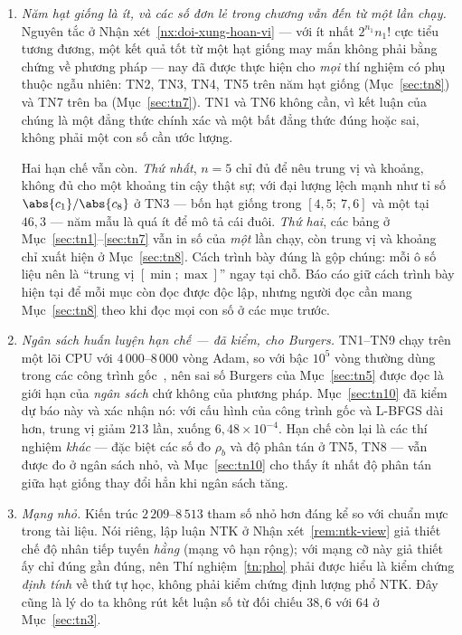 \begin{enumerate}[label=(\arabic*),leftmargin=2.2em,itemsep=4pt]
\item \emph{Năm hạt giống là ít, và các số đơn lẻ trong chương vẫn đến từ một
lần chạy.} Nguyên tắc ở Nhận xét~\ref{nx:doi-xung-hoan-vi} --- với ít nhất
$2^{n_1}n_1!$ cực tiểu tương đương, một kết quả tốt từ một hạt giống may mắn
không phải bằng chứng về phương pháp --- nay đã được thực hiện cho \emph{mọi}
thí nghiệm có phụ thuộc ngẫu nhiên: TN2, TN3, TN4, TN5 trên năm hạt giống
(Mục~\ref{sec:tn8}) và TN7 trên ba (Mục~\ref{sec:tn7}). TN1 và TN6 không cần,
vì kết luận của chúng là một đẳng thức chính xác và một bất đẳng thức đúng hoặc
sai, không phải một con số cần ước lượng.

Hai hạn chế vẫn còn. \emph{Thứ nhất}, $n = 5$ chỉ đủ để nêu trung vị và khoảng,
không đủ cho một khoảng tin cậy thật sự; với đại lượng lệch mạnh như tỉ số
$\abs{c_1}/\abs{c_8}$ ở TN3 --- bốn hạt giống trong $[4{,}5;\ 7{,}6]$ và một tại
$46{,}3$ --- năm mẫu là quá ít để mô tả cái đuôi. \emph{Thứ hai}, các bảng ở
Mục~\ref{sec:tn1}--\ref{sec:tn7} vẫn in số của \emph{một} lần chạy, còn trung
vị và khoảng chỉ xuất hiện ở Mục~\ref{sec:tn8}. Cách trình bày đúng là gộp
chúng: mỗi ô số liệu nên là ``trung vị $[\min;\max]$'' ngay tại chỗ. Báo cáo
giữ cách trình bày hiện tại để mỗi mục còn đọc được độc lập, nhưng người đọc cần
mang Mục~\ref{sec:tn8} theo khi đọc mọi con số ở các mục trước.
 
\item \emph{Ngân sách huấn luyện hạn chế --- đã kiểm, cho Burgers.} TN1--TN9
chạy trên một lõi CPU với $4\,000$--$8\,000$ vòng Adam, so với bậc $10^5$ vòng
thường dùng trong các công trình gốc~\cite{raissi2019}, nên sai số Burgers của
Mục~\ref{sec:tn5} được đọc là giới hạn của \emph{ngân sách} chứ không của
phương pháp. Mục~\ref{sec:tn10} đã kiểm dự báo này và xác nhận nó: với cấu hình
của công trình gốc và L-BFGS dài hơn, trung vị giảm $213$ lần, xuống
$6{,}48\times10^{-4}$. Hạn chế còn lại là các thí nghiệm \emph{khác} --- đặc biệt
các số đo $\rho_b$ và độ phân tán ở TN5, TN8 --- vẫn được đo ở ngân sách nhỏ, và
Mục~\ref{sec:tn10} cho thấy ít nhất độ phân tán giữa hạt giống thay đổi hẳn khi
ngân sách tăng.
 
\item \emph{Mạng nhỏ.} Kiến trúc $2\,209$--$8\,513$ tham số nhỏ hơn đáng kể so với
chuẩn mực trong tài liệu. Nói riêng, lập luận NTK ở Nhận xét~\ref{rem:ntk-view}
giả thiết chế độ nhân tiếp tuyến \emph{hằng} (mạng vô hạn rộng); với mạng cỡ này
giả thiết ấy chỉ đúng gần đúng, nên Thí nghiệm~\ref{tn:pho} phải được hiểu là kiểm
chứng \emph{định tính} về thứ tự học, không phải kiểm chứng định lượng phổ NTK.
Đây cũng là lý do ta không rút kết luận số từ đối chiếu $38{,}6$ với $64$ ở
Mục~\ref{sec:tn3}.
 

\end{enumerate}
